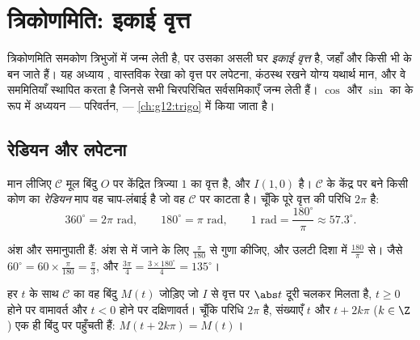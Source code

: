 \chapter{त्रिकोणमिति: इकाई वृत्त}\label{ch:g11:trigo}

त्रिकोणमिति समकोण त्रिभुजों में जन्म लेती है, पर उसका असली घर \emph{इकाई
वृत्त} है, जहाँ  और  किसी भी  के  बन जाते हैं।
यह अध्याय , वास्तविक रेखा को वृत्त पर लपेटना, कंठस्थ रखने योग्य यथार्थ
मान, और वे सममितियाँ स्थापित करता है जिनसे सभी चिरपरिचित सर्वसमिकाएँ जन्म
लेती हैं। $\cos$ और $\sin$ का  के रूप में अध्ययन --- परिवर्तन,  ---
\cref{ch:g12:trigo} में किया जाता है।

\section{रेडियन और लपेटना}

\begin{definition}[रेडियन]\label{def:g11:trigo:radian}
मान लीजिए $\mathcal C$ मूल बिंदु $O$ पर केंद्रित त्रिज्या $1$ का वृत्त है, और $I(1, 0)$ है।
$\mathcal C$ के केंद्र पर बने किसी कोण का \emph{रेडियन} माप वह चाप-लंबाई
है जो वह $\mathcal C$ पर काटता है। चूँकि पूरे वृत्त की परिधि $2\pi$ है:
\[
360^\circ = 2\pi \text{ rad},
\qquad
180^\circ = \pi \text{ rad},
\qquad
1 \text{ rad} = \frac{180^\circ}{\pi} \approx 57.3^\circ .
\]
\end{definition}

\begin{method}[रूपांतरण]\label{met:g11:trigo:convert}
अंश और  समानुपाती हैं: अंश से  में जाने के लिए $\frac{\pi}{180}$ से गुणा
कीजिए, और उलटी दिशा में $\frac{180}{\pi}$ से। जैसे $60^\circ = 60 \times \frac{\pi}{180} = \frac{\pi}{3}$, और $\frac{3\pi}{4} = \frac{3 \times 180^\circ}{4} = 135^\circ$।
\end{method}

\begin{definition}[रेखा को वृत्त पर लपेटना]\label{def:g11:trigo:winding}
हर  $t$ के साथ $\mathcal C$ का वह बिंदु $M(t)$ जोड़िए जो $I$ से वृत्त
पर $\abs t$ दूरी चलकर मिलता है, $t \geq 0$ होने पर वामावर्त और $t < 0$ होने पर दक्षिणावर्त।
चूँकि परिधि $2\pi$ है, संख्याएँ $t$ और $t + 2k\pi$ ($k \in \Z$) एक ही बिंदु पर पहुँचती
हैं: $M(t + 2k\pi) = M(t)$।
\end{definition}

